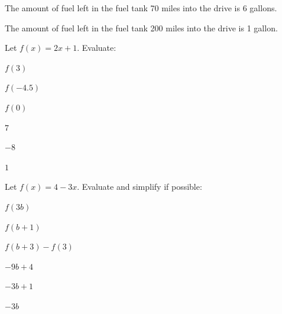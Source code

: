 \begin{solution}

\begin{parts}
\item The amount of fuel left in the fuel tank 70 miles into the drive is 6 gallons.
\item The amount of fuel left in the fuel tank 200 miles into the drive is 1 gallon.
\end{parts}
\end{solution}








\begin{exercise}
Let $f(x)=2x+1$. Evaluate: 


\begin{parts}
\item $f(3)$
\item $f(-4.5)$
\item $f(0)$ 
\end{parts}
\end{exercise}



\begin{solution}

\begin{parts}
\item $7$ 
\item $-8$
\item $1$
\end{parts}
\end{solution}








\begin{exercise}
Let $f(x)=4-3x$. Evaluate and simplify if possible: 


\begin{parts}
\item $f(3b)$
\item $f(b+1)$
\item $f(b+3)-f(3)$
\end{parts}
\end{exercise}



\begin{solution}

\begin{parts}
\item $-9b+4$ 
\item $-3b+1$
\item $-3b$
\end{parts}
\end{solution}






